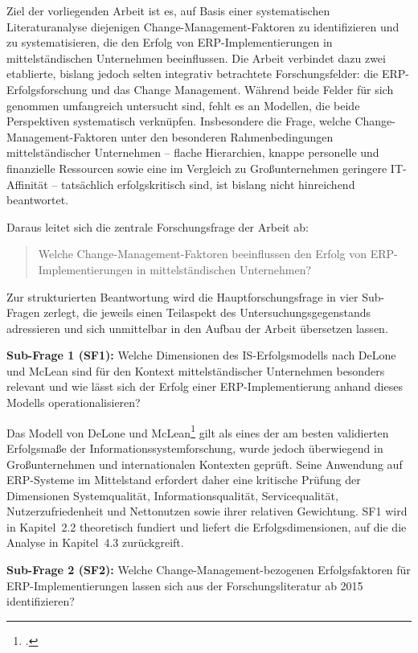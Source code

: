 Ziel der vorliegenden Arbeit ist es, auf Basis einer systematischen Literaturanalyse diejenigen Change-Management-Faktoren zu identifizieren und zu systematisieren, die den Erfolg von ERP-Implementierungen in mittelst\"andischen Unternehmen beeinflussen. Die Arbeit verbindet dazu zwei etablierte, bislang jedoch selten integrativ betrachtete Forschungsfelder: die ERP-Erfolgsforschung und das Change Management. W\"ahrend beide Felder f\"ur sich genommen umfangreich untersucht sind, fehlt es an Modellen, die beide Perspektiven systematisch verkn\"upfen. Insbesondere die Frage, welche Change-Management-Faktoren unter den besonderen Rahmenbedingungen mittelst\"andischer Unternehmen -- flache Hierarchien, knappe personelle und finanzielle Ressourcen sowie eine im Vergleich zu Gro\ss{}unternehmen geringere IT-Affinit\"at -- tats\"achlich erfolgskritisch sind, ist bislang nicht hinreichend beantwortet.

Daraus leitet sich die zentrale Forschungsfrage der Arbeit ab:

\begin{quote}
Welche Change-Management-Faktoren beeinflussen den Erfolg von ERP-Implementierungen in mittelst\"andischen Unternehmen?
\end{quote}

Zur strukturierten Beantwortung wird die Hauptforschungsfrage in vier Sub-Fragen zerlegt, die jeweils einen Teilaspekt des Untersuchungsgegenstands adressieren und sich unmittelbar in den Aufbau der Arbeit \"ubersetzen lassen.

\textbf{Sub-Frage 1 (SF1):} Welche Dimensionen des IS-Erfolgsmodells nach DeLone und McLean sind f\"ur den Kontext mittelst\"andischer Unternehmen besonders relevant und wie l\"asst sich der Erfolg einer ERP-Implementierung anhand dieses Modells operationalisieren?

Das Modell von DeLone und McLean\footcite[Vgl.][S.~9--10]{delone2003} gilt als eines der am besten validierten Erfolgsma\ss{}e der Informationssystemforschung, wurde jedoch \"uberwiegend in Gro\ss{}unternehmen und internationalen Kontexten gepr\"uft. Seine Anwendung auf ERP-Systeme im Mittelstand erfordert daher eine kritische Pr\"ufung der Dimensionen Systemqualit\"at, Informationsqualit\"at, Servicequalit\"at, Nutzerzufriedenheit und Nettonutzen sowie ihrer relativen Gewichtung. SF1 wird in Kapitel~2.2 theoretisch fundiert und liefert die Erfolgsdimensionen, auf die die Analyse in Kapitel~4.3 zur\"uckgreift.

\textbf{Sub-Frage 2 (SF2):} Welche Change-Management-bezogenen Erfolgsfaktoren f\"ur ERP-Implementierungen lassen sich aus der Forschungsliteratur ab 2015 identifizieren?

